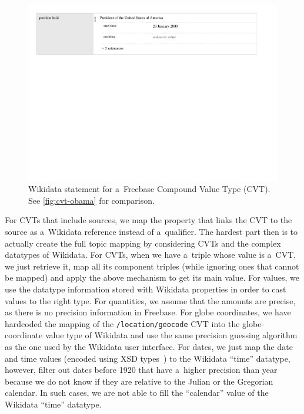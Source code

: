 \documentclass{acm_proc_article-sp}
\begin{document}
\begin{figure}[!htbp]
  \centering
  \includegraphics[width=1\columnwidth]{img/wikidata-statement-obama.pdf}
  \caption{Wikidata statement for a~Freebase Compound Value Type (CVT).
    See \autoref{fig:cvt-obama} for comparison.}
  \label{fig:statement-obama}
\end{figure}

For CVTs that include sources, we map the property that links the CVT
to the source as a~Wikidata reference instead of a~qualifier.
The hardest part then is to actually create the full topic mapping
by considering CVTs and the complex datatypes of Wikidata.
For CVTs, when we have a~triple whose value is a~CVT, we just retrieve it,
map all its component triples (while ignoring ones that cannot be mapped)
and apply the above mechanism to get its main value.
For values, we use the datatype information stored with Wikidata properties
in order to cast values to the right type.
For quantities, we assume that the amounts are precise,
as there is no precision information in Freebase.
For globe coordinates, we have hardcoded the mapping of the \texttt{/location/geocode} CVT
into the globe-coordinate value type of Wikidata
and use the same precision guessing algorithm as the one used by the Wikidata user interface.
For dates, we just map the date and time values
(encoded using XSD types~\cite{campbell2003xmlschema})
to the Wikidata ``time'' datatype, however, filter out dates before 1920 that have
a~higher precision than year because we do not know
if they are relative to the Julian or the Gregorian calendar.
In such cases, we are not able to fill the ``calendar'' value of the Wikidata ``time'' datatype.
\end{document}
